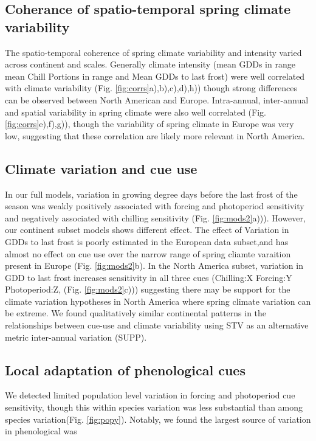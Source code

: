 \documentclass[12pt]{article}\usepackage[]{graphicx}\usepackage[]{color}
\begin{document}
\subsection*{Coherance of spatio-temporal spring climate variability}
The spatio-temporal coherence of spring climate variability and intensity varied across continent and scales. Generally climate intensity (mean GDDs in range mean Chill Portions in range and Mean GDDs to last frost) were well correlated with climate variability (Fig. \ref{fig:corrs}a),b),c),d),h)) though strong differences can be observed between North American and Europe.  Intra-annual, inter-annual and spatial variability in spring climate were also well correlated  (Fig. \ref{fig:corrs}e),f),g)), though the variability of spring climate in Europe was very low, suggesting that these correlation are likely more relevant in North America.

\subsection*{Climate variation and cue use}
In our full models, variation in growing degree days before the last frost of the season was weakly positively associated with forcing and photoperiod sensitivity and negatively associated with chilling sensitivity (Fig. \ref{fig:mods2}a))). However, our continent subset models shows different effect. The effect of Variation in GDDs to last frost is poorly estimated in the European data subset,and has almost no effect on cue use over the narrow range of spring cliamte varaition present in Europe  (Fig. \ref{fig:mods2}b). In the North America subset, variation in GDD to last frost increases sensitivity in all three cues (Chilling:X Forcing:Y Photoperiod:Z, (Fig. \ref{fig:mods2}c))) suggesting there may be support for the climate variation hypotheses in North America where spring climate variation can be extreme. We found qualitatively similar continental patterns in the relationships between cue-use and climate variability  using STV as an alternative metric inter-annual variation (SUPP).

\subsection*{Local adaptation of phenological cues}
We detected limited population level variation in forcing and photoperiod cue sensitivity, though this within species variation was less substantial than among species variation(Fig. \ref{fig:popy}). Notably, we found the largest source of variation in phenological was
\end{document}
